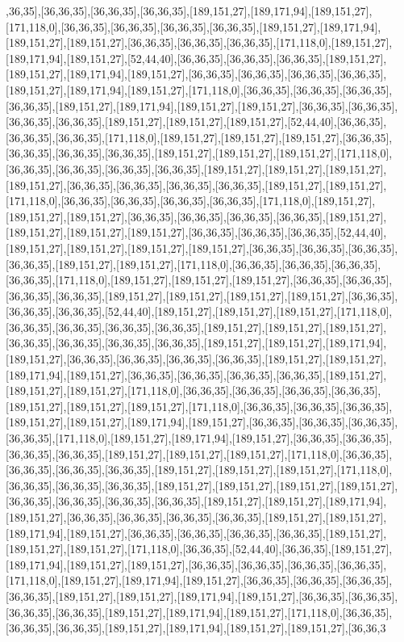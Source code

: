 ,36,35],[36,36,35],[36,36,35],[36,36,35],[189,151,27],[189,171,94],[189,151,27],[171,118,0],[36,36,35],[36,36,35],[36,36,35],[36,36,35],[189,151,27],[189,171,94],[189,151,27],[189,151,27],[36,36,35],[36,36,35],[36,36,35],[171,118,0],[189,151,27],[189,171,94],[189,151,27],[52,44,40],[36,36,35],[36,36,35],[36,36,35],[189,151,27],[189,151,27],[189,171,94],[189,151,27],[36,36,35],[36,36,35],[36,36,35],[36,36,35],[189,151,27],[189,171,94],[189,151,27],[171,118,0],[36,36,35],[36,36,35],[36,36,35],[36,36,35],[189,151,27],[189,171,94],[189,151,27],[189,151,27],[36,36,35],[36,36,35],[36,36,35],[36,36,35],[189,151,27],[189,151,27],[189,151,27],[52,44,40],[36,36,35],[36,36,35],[36,36,35],[171,118,0],[189,151,27],[189,151,27],[189,151,27],[36,36,35],[36,36,35],[36,36,35],[36,36,35],[189,151,27],[189,151,27],[189,151,27],[171,118,0],[36,36,35],[36,36,35],[36,36,35],[36,36,35],[189,151,27],[189,151,27],[189,151,27],[189,151,27],[36,36,35],[36,36,35],[36,36,35],[36,36,35],[189,151,27],[189,151,27],[171,118,0],[36,36,35],[36,36,35],[36,36,35],[36,36,35],[171,118,0],[189,151,27],[189,151,27],[189,151,27],[36,36,35],[36,36,35],[36,36,35],[36,36,35],[189,151,27],[189,151,27],[189,151,27],[189,151,27],[36,36,35],[36,36,35],[36,36,35],[52,44,40],[189,151,27],[189,151,27],[189,151,27],[189,151,27],[36,36,35],[36,36,35],[36,36,35],[36,36,35],[189,151,27],[189,151,27],[171,118,0],[36,36,35],[36,36,35],[36,36,35],[36,36,35],[171,118,0],[189,151,27],[189,151,27],[189,151,27],[36,36,35],[36,36,35],[36,36,35],[36,36,35],[189,151,27],[189,151,27],[189,151,27],[189,151,27],[36,36,35],[36,36,35],[36,36,35],[52,44,40],[189,151,27],[189,151,27],[189,151,27],[171,118,0],[36,36,35],[36,36,35],[36,36,35],[36,36,35],[189,151,27],[189,151,27],[189,151,27],[36,36,35],[36,36,35],[36,36,35],[36,36,35],[189,151,27],[189,151,27],[189,171,94],[189,151,27],[36,36,35],[36,36,35],[36,36,35],[36,36,35],[189,151,27],[189,151,27],[189,171,94],[189,151,27],[36,36,35],[36,36,35],[36,36,35],[36,36,35],[189,151,27],[189,151,27],[189,151,27],[171,118,0],[36,36,35],[36,36,35],[36,36,35],[36,36,35],[189,151,27],[189,151,27],[189,151,27],[171,118,0],[36,36,35],[36,36,35],[36,36,35],[189,151,27],[189,151,27],[189,171,94],[189,151,27],[36,36,35],[36,36,35],[36,36,35],[36,36,35],[171,118,0],[189,151,27],[189,171,94],[189,151,27],[36,36,35],[36,36,35],[36,36,35],[36,36,35],[189,151,27],[189,151,27],[189,151,27],[171,118,0],[36,36,35],[36,36,35],[36,36,35],[36,36,35],[189,151,27],[189,151,27],[189,151,27],[171,118,0],[36,36,35],[36,36,35],[36,36,35],[189,151,27],[189,151,27],[189,151,27],[189,151,27],[36,36,35],[36,36,35],[36,36,35],[36,36,35],[189,151,27],[189,151,27],[189,171,94],[189,151,27],[36,36,35],[36,36,35],[36,36,35],[36,36,35],[189,151,27],[189,151,27],[189,171,94],[189,151,27],[36,36,35],[36,36,35],[36,36,35],[36,36,35],[189,151,27],[189,151,27],[189,151,27],[171,118,0],[36,36,35],[52,44,40],[36,36,35],[189,151,27],[189,171,94],[189,151,27],[189,151,27],[36,36,35],[36,36,35],[36,36,35],[36,36,35],[171,118,0],[189,151,27],[189,171,94],[189,151,27],[36,36,35],[36,36,35],[36,36,35],[36,36,35],[189,151,27],[189,151,27],[189,171,94],[189,151,27],[36,36,35],[36,36,35],[36,36,35],[36,36,35],[189,151,27],[189,171,94],[189,151,27],[171,118,0],[36,36,35],[36,36,35],[36,36,35],[189,151,27],[189,171,94],[189,151,27],[189,151,27],[36,36,3